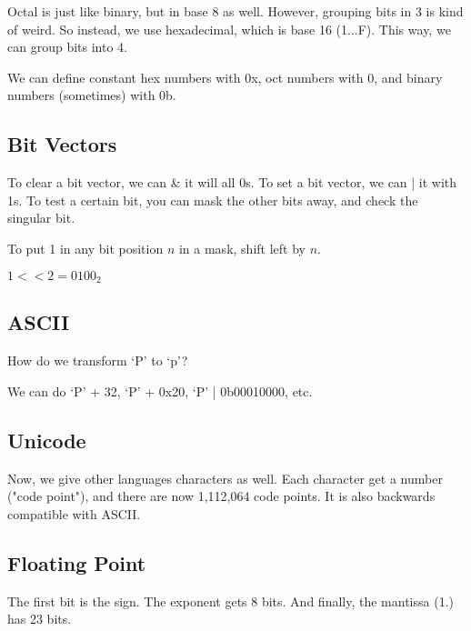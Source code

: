 
Octal is just like binary, but in base 8 as well. However, grouping bits in 3 is kind of weird. So instead, we use hexadecimal, which is base 16 (1...F). This way, we can group bits into 4.

We can define constant hex numbers with 0x, oct numbers with 0, and binary numbers (sometimes) with 0b.

\subsection{Bit Vectors}

To clear a bit vector, we can \& it will all 0s. To set a bit vector, we can | it with 1s. To test a certain bit, you can mask the other bits away, and check the singular bit.

To put 1 in any bit position \( n \) in a mask, shift left by \( n \).

\begin{eg}
	\( 1 << 2 = 0100_2 \)
\end{eg}

\subsection{ASCII}

\begin{eg}
	How do we transform `P' to `p'?
\end{eg}
\begin{explanation}
	We can do `P' + 32, `P' + 0x20, `P' | 0b00010000, etc.
\end{explanation}

\subsection{Unicode}

Now, we give other languages characters as well. Each character get a number ("code point"), and there are now 1,112,064 code points. It is also backwards compatible with ASCII.

\subsection{Floating Point}

The first bit is the sign. The exponent gets 8 bits. And finally, the mantissa (1.) has 23 bits.
